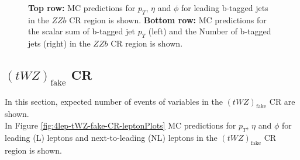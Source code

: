 \begin{figure}[htbp]
    \caption{\textbf{Top row:} MC predictions for $p_{T}$, $\eta$ and $\phi$ for leading b-tagged jets in the $ZZb$ CR region  is shown. \textbf{Bottom row:} MC predictions for the scalar sum of b-tagged jet $p_{T}$ (left) and the Number of b-tagged jets (right) in the $ZZb$ CR region  is shown.}
  \label{fig:4lep-ZZb-CR-bjetPlots}
\end{figure}



\subsection{$(tWZ)_{\text{fake}}$ CR}
\label{sec:controlplotstetralepton-tWZ-fake-CR}


In this section, expected number of events of variables in the $(tWZ)_{\text{fake}}$ CR are shown.\\

In Figure \ref{fig:4lep-tWZ-fake-CR-leptonPlots} MC predictions for $p_{T}$, $\eta$ and $\phi$ for leading (L) leptons and next-to-leading (NL) leptons in the $(tWZ)_{\text{fake}}$ CR region is shown.

